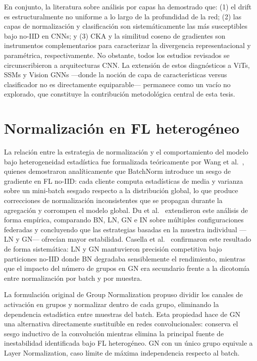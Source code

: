 En conjunto, la literatura sobre análisis por capas ha demostrado que: (1) el drift es
estructuralmente no uniforme a lo largo de la profundidad de la red; (2) las capas de normalización
y clasificación son sistemáticamente las más susceptibles bajo no-IID en CNNs; y (3) CKA y la
similitud coseno de gradientes son instrumentos complementarios para caracterizar la divergencia
representacional y paramétrica, respectivamente.
No obstante, todos los estudios revisados se circunscribieron a arquitecturas CNN.
La extensión de estos diagnósticos a ViTs, SSMs y Vision GNNs ---donde la noción de capa de
características versus clasificador no es directamente equiparable--- permanece como un vacío no
explorado, que constituye la contribución metodológica central de esta tesis.


\section{Normalización en FL heterogéneo}

La relación entre la estrategia de normalización y el comportamiento del modelo bajo heterogeneidad
estadística fue formalizada teóricamente por Wang et al.\ \cite{wang2023batch}, quienes demostraron
analíticamente que BatchNorm introduce un sesgo de gradiente en FL no-IID: cada cliente computa
estadísticas de media y varianza sobre un mini-batch sesgado respecto a la distribución global,
lo que produce correcciones de normalización inconsistentes que se propagan durante la agregación
y corrompen el modelo global.
Du et al.\ \cite{du2022rethinking} extendieron este análisis de forma empírica, comparando BN,
LN, GN e IN sobre múltiples configuraciones federadas y concluyendo que las estrategias basadas
en la muestra individual ---LN y GN--- ofrecían mayor estabilidad.
Casella et al.\ \cite{casella2023experimentingnormalizationlayersfederated} confirmaron este
resultado de forma sistemática: LN y GN mantuvieron precisión competitiva bajo particiones no-IID
donde BN degradaba sensiblemente el rendimiento, mientras que el impacto del número de grupos en
GN era secundario frente a la dicotomía entre normalización por batch y por muestra.

La formulación original de Group Normalization \cite{DBLP:journals/corr/abs-1803-08494} propuso
dividir los canales de activación en grupos y normalizar dentro de cada grupo, eliminando la
dependencia estadística entre muestras del batch.
Esta propiedad hace de GN una alternativa directamente sustituible en redes convolucionales:
conserva el sesgo inductivo de la convolución mientras elimina la principal fuente de inestabilidad
identificada bajo FL heterogéneo.
GN con un único grupo equivale a Layer Normalization, caso límite de máxima independencia
respecto al batch.

